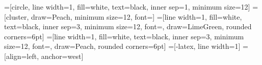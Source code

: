 =[circle, line width=1, fill=white, text=black, inner sep=1, minimum size=12]
=[cluster, draw=Peach, minimum size=12, font=\small]
=[line width=1, fill=white, text=black, inner sep=3, minimum size=12, font=\small, draw=LimeGreen, rounded corners=6pt]
=[line width=1, fill=white, text=black, inner sep=3, minimum size=12, font=\small, draw=Peach, rounded corners=6pt]
=[-latex, line width=1]
 = [align=left, anchor=west]

\newcommand{\DRAWBUCKET}[3]{
    \path[line width=3, draw=black!50!white, fill=black!20!white] (#1,#2) ++(-1,1) -- ++(0,-2) -- ++(2,0) -- ++(0,2);
    \path[fill=black!50!white] (#1,#2) ++ (-1,-1) rectangle ++(2,.5);
    \draw (#1,#2) ++(0,-.75) node[align=center, text=white]{$b_#3$};
}


